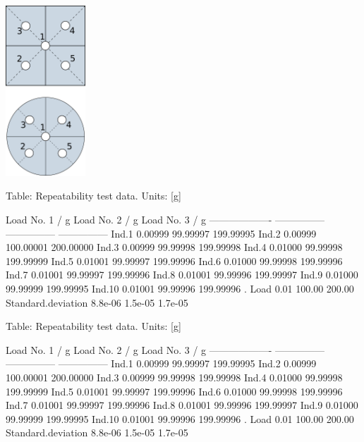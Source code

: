\documentclass[
]{article}
\begin{document}
\begin{minipage}{.3\textwidth}
  \includegraphics[width = 3cm]{eccen.png}
\end{minipage}
\begin{minipage}{.5\textwidth}

Table: Repeatability test data. Units: [g]

                      Load No. 1 / g   Load No. 2 / g   Load No. 3 / g
-------------------  ---------------  ---------------  ---------------
Ind.1                        0.00999         99.99997        199.99995
Ind.2                        0.00999        100.00001        200.00000
Ind.3                        0.00999         99.99998        199.99998
Ind.4                        0.01000         99.99998        199.99999
Ind.5                        0.01001         99.99997        199.99996
Ind.6                        0.01000         99.99998        199.99996
Ind.7                        0.01001         99.99997        199.99996
Ind.8                        0.01001         99.99996        199.99997
Ind.9                        0.01000         99.99999        199.99995
Ind.10                       0.01001         99.99996        199.99996
.                                                                     
Load                            0.01           100.00           200.00
Standard.deviation           8.8e-06          1.5e-05          1.7e-05


Table: Repeatability test data. Units: [g]

                      Load No. 1 / g   Load No. 2 / g   Load No. 3 / g
-------------------  ---------------  ---------------  ---------------
Ind.1                        0.00999         99.99997        199.99995
Ind.2                        0.00999        100.00001        200.00000
Ind.3                        0.00999         99.99998        199.99998
Ind.4                        0.01000         99.99998        199.99999
Ind.5                        0.01001         99.99997        199.99996
Ind.6                        0.01000         99.99998        199.99996
Ind.7                        0.01001         99.99997        199.99996
Ind.8                        0.01001         99.99996        199.99997
Ind.9                        0.01000         99.99999        199.99995
Ind.10                       0.01001         99.99996        199.99996
.                                                                     
Load                            0.01           100.00           200.00
Standard.deviation           8.8e-06          1.5e-05          1.7e-05
\end{minipage}
\end{document}
